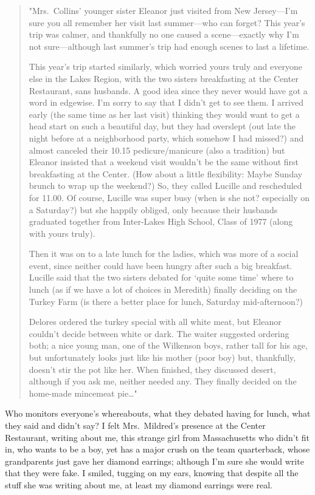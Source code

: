 \begin{quote}
"Mrs.~Collins' younger sister Eleanor just visited from New Jersey---I'm
sure you all remember her visit last summer---who can forget? This
year's trip was calmer, and thankfully no one caused a scene---exactly
why I'm not sure---although last summer's trip had enough scenes to last
a lifetime.

This year's trip started similarly, which worried yours truly and
everyone else in the Lakes Region, with the two sisters breakfasting at
the Center Restaurant, sans husbands. A good idea since they never would
have got a word in edgewise. I'm sorry to say that I didn't get to see
them. I arrived early (the same time as her last visit) thinking they
would want to get a head start on such a beautiful day, but they had
overslept (out late the night before at a neighborhood party, which
somehow I had missed?) and almost canceled their 10.15 pedicure/manicure
(also a tradition) but Eleanor insisted that a weekend visit wouldn't be
the same without first breakfasting at the Center. (How about a little
flexibility: Maybe Sunday brunch to wrap up the weekend?) So, they
called Lucille and rescheduled for 11.00. Of course, Lucille was super
busy (when is she not? especially on a Saturday?) but she happily
obliged, only because their husbands graduated together from Inter-Lakes
High School, Class of 1977 (along with yours truly).

Then it was on to a late lunch for the ladies, which was more of a
social event, since neither could have been hungry after such a big
breakfast. Lucille said that the two sisters debated for `quite some
time' where to lunch (as if we have a lot of choices in Meredith)
finally deciding on the Turkey Farm (is there a better place for lunch,
Saturday mid-afternoon?)

Delores ordered the turkey special with all white meat, but Eleanor
couldn't decide between white or dark. The waiter suggested ordering
both; a nice young man, one of the Wilkenson boys, rather tall for his
age, but unfortunately looks just like his mother (poor boy) but,
thankfully, doesn't stir the pot like her. When finished, they discussed
desert, although if you ask me, neither needed any. They finally decided
on the home-made mincemeat pie\ldots"
\end{quote}

\noindent Who monitors everyone's whereabouts, what they debated having
for lunch, what they said and didn't say? I felt Mrs.~Mildred's presence
at the Center Restaurant, writing about me, this strange girl from
Massachusetts who didn't fit in, who wants to be a boy, yet has a major
crush on the team quarterback, whose grandparents just gave her diamond
earrings; although I'm sure she would write that they were fake. I
smiled, tugging on my ears, knowing that despite all the stuff she was
writing about me, at least my diamond earrings were real.

